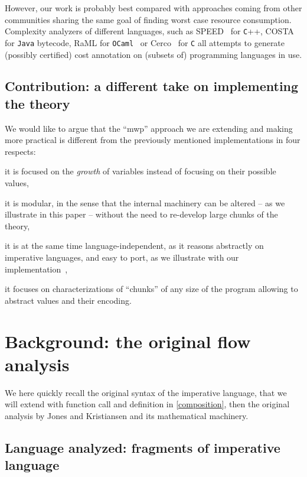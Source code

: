 \documentclass[runningheads]{llncs}
\begin{document}
However, our work is probably best compared with approaches coming from other communities sharing the same goal of finding worst case resource consumption.
Complexity analyzers of different languages, such as SPEED~\cite{Gulwani2009} for \texttt{C}++,
COSTA~\cite{Costa2007} for \texttt{Java} bytecode, RaML for \texttt{OCaml}~\cite{Lichtman2017} or
Cerco~\cite{Cerco2014} for \texttt{C} all attempts to generate (possibly
certified) cost annotation on (subsets of) programming languages in use.

\subsection{Contribution: a different take on implementing the theory}
\label{ssec:contrib}

We would like to argue that the \enquote{mwp} approach we are extending and making more practical is different from the previously mentioned implementations in four respects: \begin{enumerate*}
	\item it is focused on the \emph{growth} of variables instead of focusing on their possible values,
	\item it is modular, in the sense that the internal machinery can be altered -- as we illustrate in this paper -- without the need to re-develop large chunks of the theory,
	\item it is at the same time language-independent, as it reasons abstractly on imperative languages, and easy to port, as we illustrate with our implementation~\cite{Aubert2021f},
	\item it focuses on characterizations of \enquote{chunks} of any size of the program allowing to abstract values and their encoding.
\end{enumerate*}

\section{Background: the original flow analysis}

We here quickly recall the original syntax of the imperative language, that we will extend with function call and definition in \autoref{composition}, then the original analysis by Jones and Kristiansen and its mathematical machinery.

\subsection{Language analyzed: fragments of imperative language}
\label{subsec:language}
\end{document}
